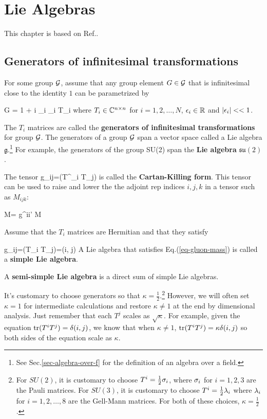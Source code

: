 \chapter{Lie Algebras}
\label{ch-lie-alg}

This chapter is based on 
Ref.\cite{birdtracks-book}.
\section{Generators of infinitesimal transformations}

For some group
${\cal G}$, assume that any group element $G\in{\cal G}$
that is infinitesimal 
close to the identity
$1$ can be parametrized by


\beq
G = 1 + i \sum_i 
\eps_i T_i
\eeq
where $T_i\in { \mathbb{C}}^{n\times n}$
for $i=1,2, \ldots, N$,
$\epsilon_i\in{ \mathbb{R}} $
and $|\epsilon_i|<<1$.

The $T_i$ matrices are called
the {\bf generators
of infinitesimal transformations}
for group ${\cal G}$.
The generators of a group ${\cal G}$ span a vector space 
called a Lie algebra $\mathfrak{g}$.\footnote{See Sec.\ref{sec-algebra-over-f}
for the definition of an algebra over a field.
} For example,
the generators of the group SU(2) 
span the {\bf Lie algebra} $\mathfrak{su(2)}$.

The tensor
\beq
g_{ij}=\tr(T^\dagger_i T_j)
\eeq
is called the {\bf Cartan-Killing form}. This tensor  can
be used to raise and lower the 
the adjoint rep indices $i, j, k$
in a tensor such as $M_{ijk}$:


\beq
M=
g^{ii'}
M
\eeq


Assume that the $T_i$ matrices are Hermitian and
that they satisfy

\beq
g_{ij}=\tr(T_i T_j)=\kappa\delta(i, j)
\label{eq-gluon-mass}
\eeq
A Lie algebra that satisfies Eq.(\ref{eq-gluon-mass})
is called a {\bf simple Lie algebra}. 

A {\bf semi-simple Lie algebra} is a direct
sum of simple Lie algebras.


It's customary to choose 
generators so that  $\kappa=\frac{1}{2}$.\footnote{For $SU(2)$,
it is customary to
choose $T^i =\frac{1}{2}\sigma_i$,
where $\sigma_i$ for $i=1,2,3$ are the Pauli matrices.
For $SU(3)$,
it is customary to choose $T^i=
\frac{1}{2}\lambda_i$
where $\lambda_i$
for $i=1,2, \ldots, 8$ are the Gell-Mann matrices.
For both of these choices,
$\kappa=\frac{1}{2}$.}
However, we will often set $\kappa=1$
for intermediate calculations
and restore $\kappa\neq 1$ at the end by dimensional analysis.
Just remember that each $T^j$ scales as $\sqrt{\kappa}$.
For example, given
the equation 
${\rm tr }(T^iT^j)=\delta(i,j)$,
we know that when $\kappa\neq 1$,
${\rm tr }(T^iT^j)=\kappa\delta(i,j)$
so both sides of the equation scale as $\kappa$.

